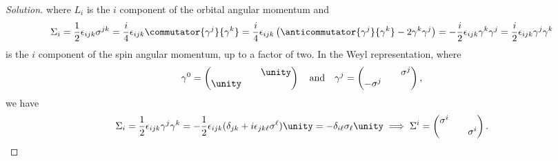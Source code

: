 \begin{proof}[Solution]
   where \(L_i\) is the \(i\) component of the orbital angular momentum and 
   \begin{equation*}
      \Sigma_i = \frac12 \epsilon_{ijk} \sigma^{jk} = \frac{i}{4} \epsilon_{ijk} \commutator{\gamma^j}{\gamma^k} = \frac{i}{4} \epsilon_{ijk} \left(\anticommutator{\gamma^j}{\gamma^k} - 2\gamma^{k} \gamma^{j}\right) = -\frac{i}{2} \epsilon_{ijk} \gamma^{k} \gamma^{j} = \frac{i}{2} \epsilon_{ijk} \gamma^{j} \gamma^{k}
   \end{equation*}
   is the \(i\) component of the spin angular momentum, up to a factor of two. In the Weyl representation, where
   \begin{equation*}
       \gamma^0 = \begin{pmatrix}
           && \unity\\
          \unity && 
       \end{pmatrix}
       \quad\text{and}\quad
       \gamma^j = \begin{pmatrix}
           && \sigma^j\\
          -\sigma^j &&
       \end{pmatrix},
   \end{equation*}
   we have
   \begin{equation*}
   \Sigma_i = \frac12 \epsilon_{ijk} \gamma^j \gamma^k = -\frac12 \epsilon_{ijk} (\delta_{jk} + i \epsilon_{jk\ell} \sigma^{\ell}) \unity = -\delta_{i \ell} \sigma_\ell \unity \implies \Sigma^i = \begin{pmatrix}
      \sigma^i &&\\
               && \sigma^i
   \end{pmatrix}.
   \end{equation*}


\end{proof}

